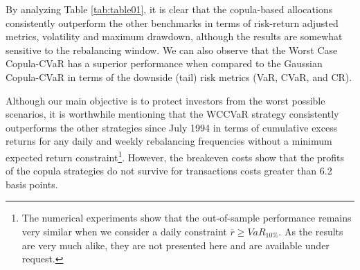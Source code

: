 \documentclass[a4paper,10pt]{article}
\begin{document}
By analyzing Table \ref{tab:table01}, it is clear that the copula-based allocations consistently outperform the other benchmarks in terms of risk-return adjusted metrics, volatility and maximum drawdown, although the results are somewhat sensitive to the rebalancing window. We can also observe that the Worst Case Copula-CVaR has a superior performance when compared to the Gaussian Copula-CVaR in terms of the downside (tail) risk metrics (VaR, CVaR, and CR). 

Although our main objective is to protect investors from the worst possible scenarios, it is worthwhile mentioning that the WCCVaR strategy consistently outperforms the other strategies since July 1994 in terms of cumulative excess returns for any daily and weekly rebalancing frequencies without a minimum expected return constraint\footnote{The numerical experiments show that the out-of-sample performance remains very similar when we consider a daily constraint $\overline{r}{\geq }VaR_{10\%}$. As the results are very much alike, they are not presented here and are available under request.}. However, the breakeven costs show that the profits of the copula strategies do not survive for transactions costs greater than 6.2 basis points.
\end{document}
